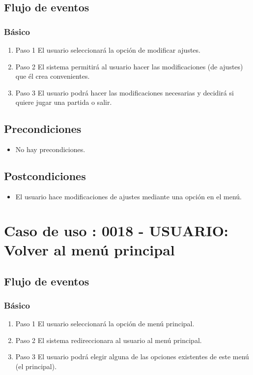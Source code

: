 \subsection{Flujo de eventos}

\subsubsection{Básico}

\begin{enumerate}
\item Paso 1
El usuario seleccionará la opción de modificar ajustes. 
\item Paso 2
El sistema permitirá al usuario hacer las modificaciones (de ajustes) que él crea convenientes. 
\item Paso 3
El usuario podrá hacer las modificaciones necesarias y decidirá si quiere jugar una partida o salir.
\end{enumerate}

\subsection{Precondiciones}
\begin{itemize}
\item No hay precondiciones.
\end{itemize}
\subsection{Postcondiciones}
\begin{itemize}
\item El usuario hace modificaciones de ajustes mediante una opción en el menú.
\end{itemize}


\section{Caso de uso : 0018 - USUARIO: Volver al menú principal}\label{sec:uc0}

\subsection{Flujo de eventos}

\subsubsection{Básico}

\begin{enumerate}
\item Paso 1
El usuario seleccionará la opción de menú principal. 
\item Paso 2
El sistema redireccionara al usuario al menú principal. 
\item Paso 3
El usuario podrá elegir alguna de las opciones existentes de este menú (el principal).
\end{enumerate}

